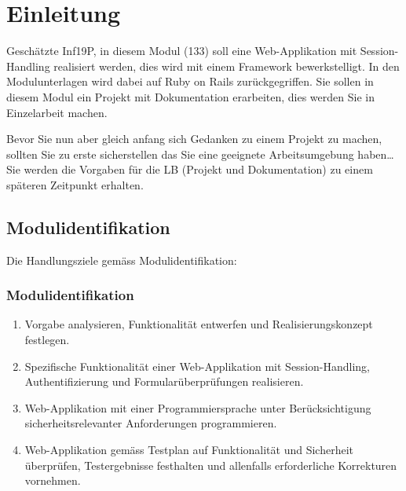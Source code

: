 \mode*


\section{Einleitung}
\label{sec:einleitung}

\begin{frame}[fragile]
    Geschätzte Inf19P, in diesem Modul (133) soll eine Web-Applikation mit Session-Handling realisiert werden, dies wird
    mit einem Framework bewerkstelligt.
    In den Modulunterlagen wird dabei auf Ruby on Rails zurückgegriffen.
    Sie sollen in diesem Modul ein Projekt mit Dokumentation erarbeiten, dies werden Sie in Einzelarbeit machen.

    Bevor Sie nun aber gleich anfang sich Gedanken zu einem Projekt zu machen, sollten Sie zu erste sicherstellen das
    Sie eine geeignete Arbeitsumgebung haben\ldots
    Sie werden die Vorgaben für die LB (Projekt und Dokumentation) zu einem späteren Zeitpunkt erhalten.
\end{frame}

\subsection{Modulidentifikation}
\label{subsec:modulid}
Die Handlungsziele gemäss Modulidentifikation:
\begin{frame}[fragile]
    \frametitle<presentation>{Modulidentifikation}
    \begin{enumerate}
        \item Vorgabe analysieren, Funktionalität entwerfen und
        Realisierungskonzept festlegen.
        \item Spezifische Funktionalität einer Web-Applikation mit Session-Handling,
        Authentifizierung und Formularüberprüfungen realisieren.
        \item Web-Applikation mit einer Programmiersprache unter
        Berücksichtigung sicherheitsrelevanter Anforderungen
        programmieren.
        \item Web-Applikation gemäss Testplan auf Funktionalität und
        Sicherheit überprüfen, Testergebnisse festhalten und
        allenfalls erforderliche Korrekturen vornehmen.
    \end{enumerate}
\end{frame}

